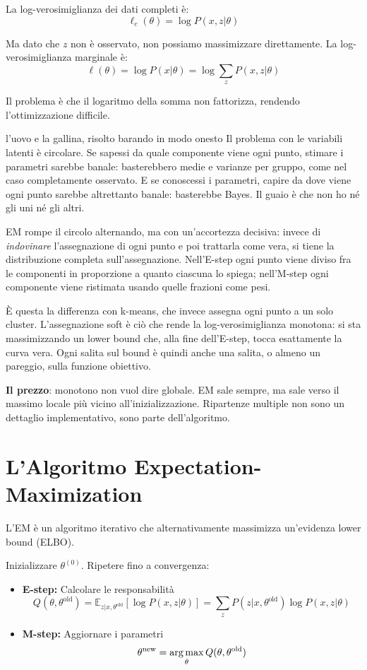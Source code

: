 La log-verosimiglianza dei dati completi è:
\[\ell_c(\theta) = \log P(x,z|\theta)\]

Ma dato che $z$ non è osservato, non possiamo massimizzare direttamente. La log-verosimiglianza marginale è:
\[\ell(\theta) = \log P(x|\theta) = \log \sum_z P(x,z|\theta)\]

Il problema è che il logaritmo della somma non fattorizza, rendendo l'ottimizzazione difficile.

\begin{intuizione}{l'uovo e la gallina, risolto barando in modo onesto}
Il problema con le variabili latenti è circolare. Se sapessi da quale componente viene ogni punto, stimare i parametri sarebbe banale: basterebbero medie e varianze per gruppo, come nel caso completamente osservato. E se conoscessi i parametri, capire da dove viene ogni punto sarebbe altrettanto banale: basterebbe Bayes. Il guaio è che non ho né gli uni né gli altri.

EM rompe il circolo alternando, ma con un'accortezza decisiva: invece di \emph{indovinare} l'assegnazione di ogni punto e poi trattarla come vera, si tiene la distribuzione completa sull'assegnazione. Nell'E-step ogni punto viene diviso fra le componenti in proporzione a quanto ciascuna lo spiega; nell'M-step ogni componente viene ristimata usando quelle frazioni come pesi.

È questa la differenza con k-means, che invece assegna ogni punto a un solo cluster. L'assegnazione soft è ciò che rende la log-verosimiglianza monotona: si sta massimizzando un lower bound che, alla fine dell'E-step, tocca esattamente la curva vera. Ogni salita sul bound è quindi anche una salita, o almeno un pareggio, sulla funzione obiettivo.

\textbf{Il prezzo}: monotono non vuol dire globale. EM sale sempre, ma sale verso il massimo locale più vicino all'inizializzazione. Ripartenze multiple non sono un dettaglio implementativo, sono parte dell'algoritmo.
\end{intuizione}

\section{L'Algoritmo Expectation-Maximization}

L'EM è un algoritmo iterativo che alternativamente massimizza un'evidenza lower bound (ELBO).

\begin{theorem}[Algoritmo EM]
  Inizializzare $\theta^{(0)}$. Ripetere fino a convergenza:
  \begin{itemize}
    \item \textbf{E-step:} Calcolare le responsabilità
    \[Q(\theta, \theta^{\text{old}}) = \mathbb{E}_{z|x,\theta^{\text{old}}}[\log P(x,z|\theta)] = \sum_z P(z|x,\theta^{\text{old}}) \log P(x,z|\theta)\]

    \item \textbf{M-step:} Aggiornare i parametri
    \[\theta^{\text{new}} = \operatorname*{arg\,max}_\theta Q(\theta, \theta^{\text{old}})\]
  \end{itemize}
\end{theorem}

